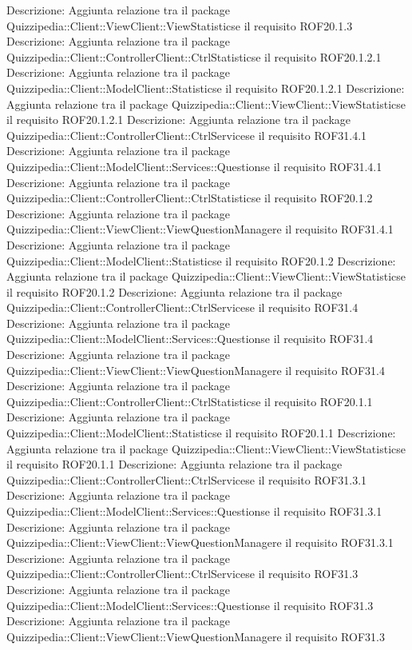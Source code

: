 Descrizione: Aggiunta relazione tra il package Quizzipedia::Client::ViewClient::ViewStatisticse il requisito ROF20.1.3 
Descrizione: Aggiunta relazione tra il package Quizzipedia::Client::ControllerClient::CtrlStatisticse il requisito ROF20.1.2.1 
Descrizione: Aggiunta relazione tra il package Quizzipedia::Client::ModelClient::Statisticse il requisito ROF20.1.2.1 
Descrizione: Aggiunta relazione tra il package Quizzipedia::Client::ViewClient::ViewStatisticse il requisito ROF20.1.2.1 
Descrizione: Aggiunta relazione tra il package Quizzipedia::Client::ControllerClient::CtrlServicese il requisito ROF31.4.1 
Descrizione: Aggiunta relazione tra il package Quizzipedia::Client::ModelClient::Services::Questionse il requisito ROF31.4.1 
Descrizione: Aggiunta relazione tra il package Quizzipedia::Client::ControllerClient::CtrlStatisticse il requisito ROF20.1.2 
Descrizione: Aggiunta relazione tra il package Quizzipedia::Client::ViewClient::ViewQuestionManagere il requisito ROF31.4.1 
Descrizione: Aggiunta relazione tra il package Quizzipedia::Client::ModelClient::Statisticse il requisito ROF20.1.2 
Descrizione: Aggiunta relazione tra il package Quizzipedia::Client::ViewClient::ViewStatisticse il requisito ROF20.1.2 
Descrizione: Aggiunta relazione tra il package Quizzipedia::Client::ControllerClient::CtrlServicese il requisito ROF31.4 
Descrizione: Aggiunta relazione tra il package Quizzipedia::Client::ModelClient::Services::Questionse il requisito ROF31.4 
Descrizione: Aggiunta relazione tra il package Quizzipedia::Client::ViewClient::ViewQuestionManagere il requisito ROF31.4 
Descrizione: Aggiunta relazione tra il package Quizzipedia::Client::ControllerClient::CtrlStatisticse il requisito ROF20.1.1 
Descrizione: Aggiunta relazione tra il package Quizzipedia::Client::ModelClient::Statisticse il requisito ROF20.1.1 
Descrizione: Aggiunta relazione tra il package Quizzipedia::Client::ViewClient::ViewStatisticse il requisito ROF20.1.1 
Descrizione: Aggiunta relazione tra il package Quizzipedia::Client::ControllerClient::CtrlServicese il requisito ROF31.3.1 
Descrizione: Aggiunta relazione tra il package Quizzipedia::Client::ModelClient::Services::Questionse il requisito ROF31.3.1 
Descrizione: Aggiunta relazione tra il package Quizzipedia::Client::ViewClient::ViewQuestionManagere il requisito ROF31.3.1 
Descrizione: Aggiunta relazione tra il package Quizzipedia::Client::ControllerClient::CtrlServicese il requisito ROF31.3 
Descrizione: Aggiunta relazione tra il package Quizzipedia::Client::ModelClient::Services::Questionse il requisito ROF31.3 
Descrizione: Aggiunta relazione tra il package Quizzipedia::Client::ViewClient::ViewQuestionManagere il requisito ROF31.3 
